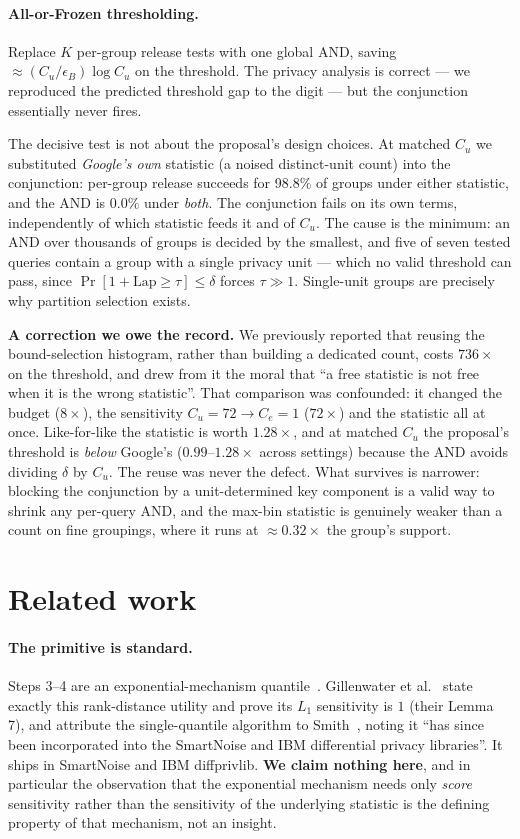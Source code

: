 \documentclass[11pt,a4paper]{article}
\newcommand{\Cu}{C_u}
\newcommand{\Ce}{C_e}
\begin{document}
\paragraph{All-or-Frozen thresholding.} Replace $K$ per-group release tests with one global AND,
saving $\approx(\Cu/\epsilon_B)\log\Cu$ on the threshold. The privacy analysis is correct --- we
reproduced the predicted threshold gap to the digit --- but the conjunction essentially never fires.

The decisive test is not about the proposal's design choices. At matched $\Cu$ we substituted
\emph{Google's own} statistic (a noised distinct-unit count) into the conjunction: per-group release
succeeds for 98.8\% of groups under either statistic, and the AND is $0.0\%$ under \emph{both}. The
conjunction fails on its own terms, independently of which statistic feeds it and of $\Cu$. The
cause is the minimum: an AND over thousands of groups is decided by the smallest, and five of seven
tested queries contain a group with a single privacy unit --- which no valid threshold can pass,
since $\Pr[1+\mathrm{Lap}\ge\tau]\le\delta$ forces $\tau\gg1$. Single-unit groups are precisely why
partition selection exists.

\textbf{A correction we owe the record.} We previously reported that reusing the bound-selection
histogram, rather than building a dedicated count, costs $736\times$ on the threshold, and drew from
it the moral that ``a free statistic is not free when it is the wrong statistic''. That comparison
was confounded: it changed the budget ($8\times$), the sensitivity $\Cu{=}72\to\Ce{=}1$
($72\times$) and the statistic all at once. Like-for-like the statistic is worth $1.28\times$, and at
matched $\Cu$ the proposal's threshold is \emph{below} Google's ($0.99$--$1.28\times$ across
settings) because the AND avoids dividing $\delta$ by $\Cu$. The reuse was never the defect. What
survives is narrower: blocking the conjunction by a unit-determined key component is a valid way to
shrink any per-query AND, and the max-bin statistic is genuinely weaker than a count on fine
groupings, where it runs at $\approx0.32\times$ the group's support.

\section{Related work}\label{sec:related}

\paragraph{The primitive is standard.} Steps 3--4 are an exponential-mechanism
quantile~\cite{mcsherry2007}. Gillenwater et al.~\cite{gillenwater2021} state exactly this
rank-distance utility and prove its $L_1$ sensitivity is $1$ (their Lemma 7), and attribute the
single-quantile algorithm to Smith~\cite{smith2011}, noting it ``has since been incorporated into
the SmartNoise and IBM differential privacy libraries''. It ships in SmartNoise and IBM diffprivlib. \textbf{We claim nothing here}, and
in particular the observation that the exponential mechanism needs only \emph{score} sensitivity
rather than the sensitivity of the underlying statistic is the defining property of that mechanism,
not an insight.
\end{document}
